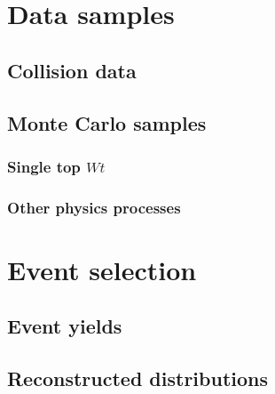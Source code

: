 \section{Data samples}
\subsection{Collision data}
\subsection{Monte Carlo samples}
\subsubsection{\ttbar}
\subsubsection{Single top $Wt$}
\subsubsection{Other physics processes}
\section{Event selection}
\subsection{Event yields}
\subsection{Reconstructed distributions}
